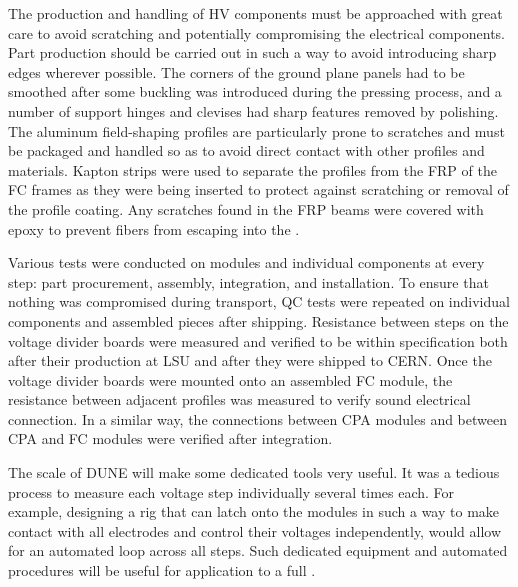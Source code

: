 The production and handling of HV components must be approached with %
great care to avoid scratching and potentially compromising the electrical components. %
Part production should be carried out in such a way to avoid introducing sharp edges wherever possible.
The corners of the ground plane panels had to be smoothed after some buckling was introduced during the pressing process, and a number of support hinges and clevises had sharp features removed by polishing.
The aluminum field-shaping profiles are particularly prone to scratches and must be packaged and handled so as to avoid direct contact with other profiles and materials.
Kapton strips were used to separate the profiles from the FRP of the FC frames as they were being inserted to protect against scratching or removal of the profile coating.
Any scratches found in the FRP beams were covered with epoxy to prevent fibers from escaping into the .

Various  tests were conducted on  modules and individual components at every step: %
part procurement, assembly, integration, and installation.
To ensure that nothing was compromised during transport, QC tests were repeated on individual components and assembled pieces after shipping. 
Resistance between steps on the voltage divider boards were measured and verified to be within specification both after their production at LSU and after they were shipped to CERN.
Once the voltage divider boards were mounted onto an assembled FC module, the resistance between adjacent profiles was measured to verify sound electrical connection.
In a similar way, the connections between CPA modules and between CPA and FC modules were verified after integration.

The scale of DUNE will make some dedicated  tools very useful.
It was a tedious process to measure each voltage step individually several times each.
For example, designing a rig that can latch onto the  modules in such a way to make contact with all electrodes and control their voltages independently, would allow for an automated loop across all steps.
Such dedicated equipment and automated procedures will be useful for application to a full .

